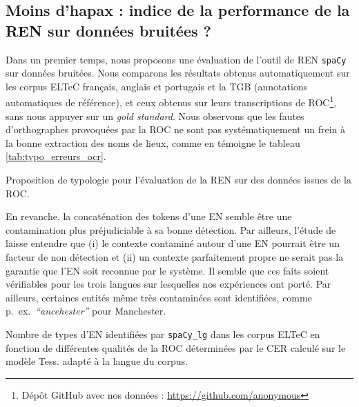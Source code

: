 \subsection{Moins d'hapax : indice de la performance de la REN sur données bruitées ?}
\label{subsec:eval_manu_OCR-IMPACT-NER}
Dans un premier temps, nous proposons une évaluation de l'outil de REN \texttt{spaCy} sur données bruitées. Nous comparons les résultats obtenus automatiquement sur les corpus ELTeC français, anglais et portugais et la TGB (annotations automatiques de référence), et ceux obtenus sur leurs transcriptions de ROC\footnote{Dépôt GitHub avec nos données : \url{https://github.com/anonymous}}, sans nous appuyer sur un \textit{gold standard}. Nous observons que les fautes d'orthographes provoquées par la ROC ne sont pas systématiquement un frein à la bonne extraction des noms de lieux, comme en témoigne le tableau \ref{tab:typo_erreurs_ocr}.
\begin{table}[h!]
\small
    \centering
   
    \caption{Proposition de typologie pour l'évaluation de la REN sur des données issues de la ROC.}
    \label{tab:typo_erreurs_ocr}
\end{table}

En revanche, la concaténation des tokens d'une EN semble être une contamination plus préjudiciable à sa bonne détection. Par ailleurs, l'étude de \cite{DBLP:conf/gis/Koudoro-Parfait21} laisse entendre que (i) le contexte contaminé autour d'une EN pourrait être un facteur de non détection et (ii) un contexte parfaitement propre ne serait pas la garantie que l'EN soit reconnue par le système. Il semble que ces faits soient vérifiables pour les trois langues sur lesquelles nos expériences ont porté. Par ailleurs, certaines entités même très contaminées sont identifiées, comme p.\ ex.\  \textit{``ancehester''} pour \og{}Manchester\fg{}. 


\begin{table}[h!]
    \centering
    \small
    
    \caption{Nombre de types d'EN identifiées par \texttt{spaCy\_lg} dans les corpus ELTeC  en fonction de différentes qualités de la ROC déterminées par le CER calculé sur le modèle Tess. adapté à la langue du corpus. 
    }
    \label{tab:ELTeC_bon_mauvais}
\end{table}

